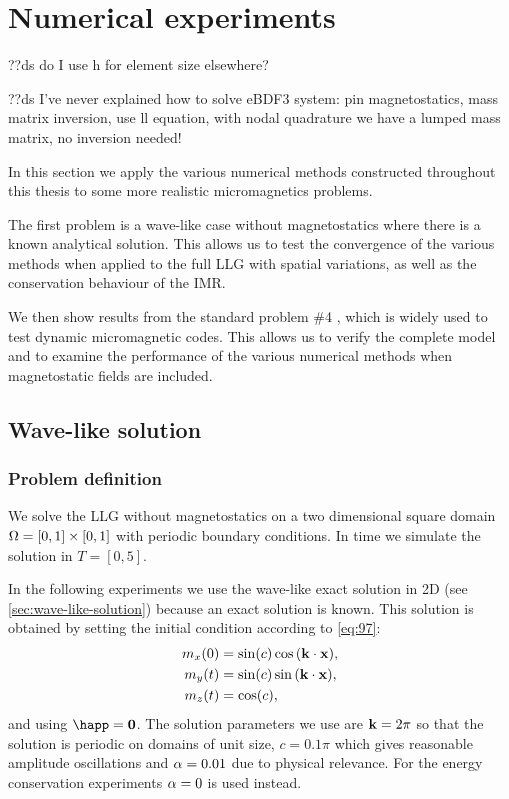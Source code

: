 \chapter{Numerical experiments}
\label{cha:numer-experiments}


??ds do I use h for element size elsewhere?

??ds I've never explained how to solve eBDF3 system: pin magnetostatics, mass matrix inversion, use ll equation, with nodal quadrature we have a lumped mass matrix, no inversion needed!


In this section we apply the various numerical methods constructed throughout this thesis to some more realistic micromagnetics problems.

The first problem is a wave-like case without magnetostatics where there is a known analytical solution.
This allows us to test the convergence of the various methods when applied to the full LLG with spatial variations, as well as the conservation behaviour of the IMR.

We then show results from the \mumag standard problem \#4 \cite{mumag-website}, which is widely used to test dynamic micromagnetic codes.
This allows us to verify the complete model and to examine the performance of the various numerical methods when magnetostatic fields are included.



\section{Wave-like solution}
\label{sec:numer-exper}

\subsection{Problem definition}
\label{sec:wave-problem-definition}

We solve the LLG without magnetostatics on a two dimensional square domain $\Omega = [0,1] \times [0,1]$ with periodic boundary conditions.
In time we simulate the solution in $T = [0, 5]$.

In the following experiments we use the wave-like exact solution in 2D (see \cref{sec:wave-like-solution}) because an exact solution is known.
This solution is obtained by setting the initial condition according to \cref{eq:97}:
\begin{equation}
  \begin{aligned}
    m_x(0) &= \sin(c) \cos{\left( \boldsymbol{\mathrm{k}}\cdot \boldsymbol{\mathrm{x}}\right)}, \\
    m_y(t) &= \sin(c) \sin{\left( \boldsymbol{\mathrm{k}}\cdot \boldsymbol{\mathrm{x}}\right)}, \\
    m_z(t) &= \cos(c),
  \end{aligned}
\end{equation}
and using $\happ = \zerov$.
The solution parameters we use are $\boldsymbol{\mathrm{k}} = 2\pi$ so that the solution is periodic on domains of unit size, $c = 0.1\pi$ which gives reasonable amplitude oscillations and $\alpha = 0.01$ due to physical relevance.
For the energy conservation experiments $\alpha = 0$ is used instead.


